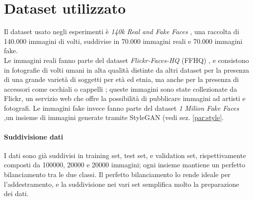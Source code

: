 \section{Dataset utilizzato}\label{sec:dataset}
Il dataset usato negli esperimenti è \textit{140k Real and Fake Faces} \cite{140kRealFake}, una raccolta di 140.000 immagini di volti, suddivise in 70.000  immagini reali e 70.000 immagini fake.\\
Le immagini reali fanno parte del dataset \textit{Flickr-Faces-HQ} (FFHQ) \cite{NVlabsFfhqdataset2025}, e consistono in fotografie di volti umani in alta qualità distinte da altri dataset per la presenza di una grande varietà di soggetti per età ed etnia, ma anche per la presenza di accessori come occhiali o cappelli \cite{karras2019style}; queste immagini sono state collezionate da Flickr, un servizio web che offre la possibilità di pubblicare immagini ad artisti e fotografi.
Le immagini fake invece fanno parte del dataset \textit{1 Milion Fake Faces} ,un insieme di immagini generate tramite StyleGAN (vedi sez. \ref{par:style}.
\paragraph{Suddivisione dati} I dati sono già suddivisi in training set, test set, e validation set, rispettivamente composti da 100000, 20000 e 20000 immagini; ogni insieme mantiene un perfetto bilanciamento tra le due classi. Il perfetto bilanciamento lo rende ideale per l'addestramento, e la suddivisione nei vari set semplifica molto la preparazione dei dati.

